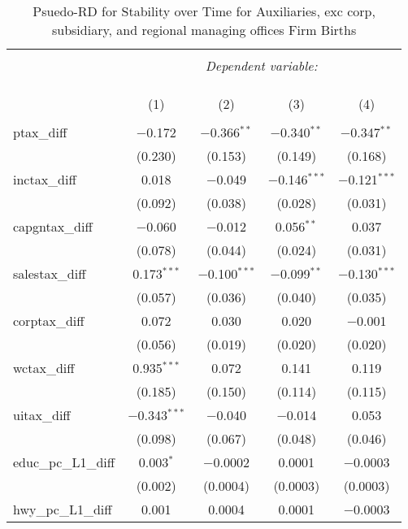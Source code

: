 
\begin{table}[!htbp] \centering 
  \caption{Psuedo-RD for Stability over Time for  Auxiliaries, exc corp, subsidiary, and regional managing offices Firm Births} 
  \label{} 
\begin{tabular}{@{\extracolsep{5pt}}lcccc} 
\\[-1.8ex]\hline 
\hline \\[-1.8ex] 
 & \multicolumn{4}{c}{\textit{Dependent variable:}} \\ 
\cline{2-5} 
\\[-1.8ex] & \multicolumn{4}{c}{ } \\ 
\\[-1.8ex] & (1) & (2) & (3) & (4)\\ 
\hline \\[-1.8ex] 
 ptax\_diff & $-$0.172 & $-$0.366$^{**}$ & $-$0.340$^{**}$ & $-$0.347$^{**}$ \\ 
  & (0.230) & (0.153) & (0.149) & (0.168) \\ 
  inctax\_diff & 0.018 & $-$0.049 & $-$0.146$^{***}$ & $-$0.121$^{***}$ \\ 
  & (0.092) & (0.038) & (0.028) & (0.031) \\ 
  capgntax\_diff & $-$0.060 & $-$0.012 & 0.056$^{**}$ & 0.037 \\ 
  & (0.078) & (0.044) & (0.024) & (0.031) \\ 
  salestax\_diff & 0.173$^{***}$ & $-$0.100$^{***}$ & $-$0.099$^{**}$ & $-$0.130$^{***}$ \\ 
  & (0.057) & (0.036) & (0.040) & (0.035) \\ 
  corptax\_diff & 0.072 & 0.030 & 0.020 & $-$0.001 \\ 
  & (0.056) & (0.019) & (0.020) & (0.020) \\ 
  wctax\_diff & 0.935$^{***}$ & 0.072 & 0.141 & 0.119 \\ 
  & (0.185) & (0.150) & (0.114) & (0.115) \\ 
  uitax\_diff & $-$0.343$^{***}$ & $-$0.040 & $-$0.014 & 0.053 \\ 
  & (0.098) & (0.067) & (0.048) & (0.046) \\ 
  educ\_pc\_L1\_diff & 0.003$^{*}$ & $-$0.0002 & 0.0001 & $-$0.0003 \\ 
  & (0.002) & (0.0004) & (0.0003) & (0.0003) \\ 
  hwy\_pc\_L1\_diff & 0.001 & 0.0004 & 0.0001 & $-$0.0003 \\ 

\end{tabular}
\end{table}
